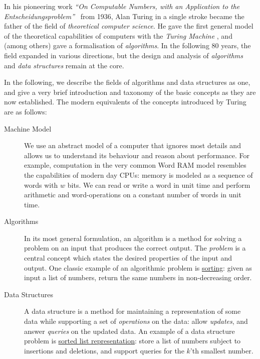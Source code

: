 In his pioneering work \emph{``On Computable Numbers, with an Application to the Entscheidungsproblem''}~\cite{turing1936computable} from 1936, Alan Turing in a single stroke became the father of the field of \emph{theoretical computer science}. He gave the first general model of the theoretical capabilities of computers with the \emph{Turing Machine}
, and (among others) gave a formalisation of \emph{algorithms}.
In the following 80 years, the field expanded in various directions, but the design and analysis of \emph{algorithms} and \emph{data structures} remain at the core. 

In the following, we describe the fields of algorithms and data structures as one, and give a very brief introduction and taxonomy of the basic concepts as they are now established.
The modern equivalents of the concepts introduced by Turing are as follows:

\begin{description}
    \item[Machine Model] We use an abstract model of a computer that ignores most details and allows us to understand its behaviour and reason about performance.
    For example, computation in the very common Word RAM model resembles the capabilities of modern day CPUs: memory is modeled as a sequence of words with $w$ bits. We can read or write a word in unit time and perform arithmetic and word-operations on a constant number of words in unit time.
    \item[Algorithms] In its most general formulation, an algorithm is a method for solving a problem on an input that produces the correct output. 
    The \emph{problem} is a central concept which states the desired properties of the input and output.
    One classic example of an algorithmic problem is \underline{sorting}: given as input a list of numbers, return the same numbers in non-decreasing order.
    \item[Data Structures] A data structure is a method for maintaining a representation of some data while supporting a set of \emph{operations} on the data: allow \emph{updates}, and answer \emph{queries} on the updated data. 
    An example of a data structure problem is \underline{sorted list representation}: store a list of numbers subject to insertions and deletions, and support queries for the $k$'th smallest number.
\end{description}

